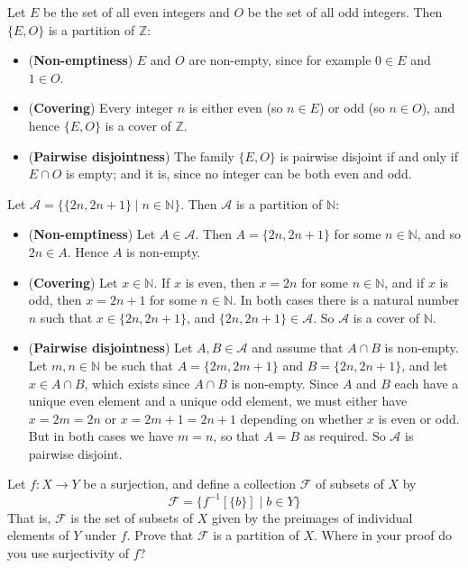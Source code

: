 \begin{example}
\label{exPartitionOfZIntoEvenAndOdd}
Let $E$ be the set of all even integers and $O$ be the set of all odd integers. Then $\{ E, O \}$ is a partition of $\mathbb{Z}$:
\begin{itemize}
\item (\textbf{Non-emptiness}) $E$ and $O$ are non-empty, since for example $0 \in E$ and $1 \in O$.
\item (\textbf{Covering}) Every integer $n$ is either even (so $n \in E$) or odd (so $n \in O$), and hence $\{ E, O \}$ is a cover of $\mathbb{Z}$.
\item (\textbf{Pairwise disjointness}) The family $\{ E, O \}$ is pairwise disjoint if and only if $E \cap O$ is empty; and it is, since no integer can be both even and odd.
\end{itemize}
\end{example}

\begin{example}
\label{exPartitionOfNIntoPairs}
Let $\mathcal{A} = \{ \{ 2n, 2n+1 \} \mid n \in \mathbb{N} \}$. Then $\mathcal{A}$ is a partition of $\mathbb{N}$:
\begin{itemize}
\item (\textbf{Non-emptiness}) Let $A \in \mathcal{A}$. Then $A = \{ 2n, 2n+1 \}$ for some $n \in \mathbb{N}$, and so $2n \in A$. Hence $A$ is non-empty.
\item (\textbf{Covering}) Let $x \in \mathbb{N}$. If $x$ is even, then $x=2n$ for some $n \in \mathbb{N}$, and if $x$ is odd, then $x=2n+1$ for some $n \in \mathbb{N}$. In both cases there is a natural number $n$ such that $x \in \{ 2n, 2n+1 \}$, and $\{ 2n, 2n+1 \} \in \mathcal{A}$. So $\mathcal{A}$ is a cover of $\mathbb{N}$.
\item (\textbf{Pairwise disjointness}) Let $A,B \in \mathcal{A}$ and assume that $A \cap B$ is non-empty. Let $m,n \in \mathbb{N}$ be such that $A = \{ 2m, 2m+1 \}$ and $B = \{ 2n, 2n+1 \}$, and let $x \in A \cap B$, which exists since $A \cap B$ is non-empty. Since $A$ and $B$ each have a unique even element and a unique odd element, we must either have $x=2m=2n$ or $x=2m+1=2n+1$ depending on whether $x$ is even or odd. But in both cases we have $m=n$, so that $A=B$ as required. So $\mathcal{A}$ is pairwise disjoint.
\end{itemize}
\end{example}

\begin{exercise}
\label{exPreimagesFormPartition}
Let $f : X \to Y$ be a surjection, and define a collection $\mathcal{F}$ of subsets of $X$ by
\[ \mathcal{F} = \{ f^{-1}[\{b\}] \mid b \in Y \} \]
That is, $\mathcal{F}$ is the set of subsets of $X$ given by the preimages of individual elements of $Y$ under $f$. Prove that $\mathcal{F}$ is a partition of $X$. Where in your proof do you use surjectivity of $f$?
\end{exercise}


